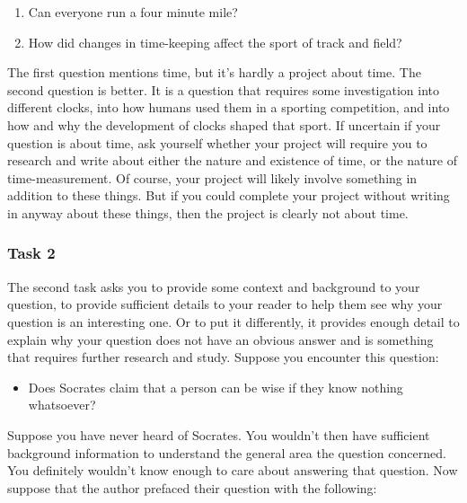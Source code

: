\documentclass[]{article}
\providecommand{\tightlist}{%
  \setlength{\itemsep}{0pt}\setlength{\parskip}{0pt}}
\begin{document}
\begin{enumerate}
\def\labelenumi{\arabic{enumi}.}
\tightlist
\item
  Can everyone run a four minute mile?
\item
  How did changes in time-keeping affect the sport of track and field?
\end{enumerate}

The first question mentions time, but it's hardly a project about time.
The second question is better. It is a question that requires some
investigation into different clocks, into how humans used them in a
sporting competition, and into how and why the development of clocks
shaped that sport. If uncertain if your question is about time, ask
yourself whether your project will require you to research and write
about either the nature and existence of time, or the nature of
time-measurement. Of course, your project will likely involve something
in addition to these things. But if you could complete your project
without writing in anyway about these things, then the project is
clearly not about time.

\hypertarget{task-2}{%
\subsubsection{Task 2}\label{task-2}}

The second task asks you to provide some context and background to your
question, to provide sufficient details to your reader to
help them see why your question is an interesting one. Or to put it
differently, it provides enough detail to explain why your question does
not have an obvious answer and is something that requires further
research and study. Suppose you encounter this question:

\begin{itemize}
\tightlist
\item
  Does Socrates claim that a person can be wise if they know nothing
  whatsoever?
\end{itemize}

Suppose you have never heard of Socrates. You wouldn't then have sufficient background information to understand the general area the question concerned. You definitely wouldn't know enough to care about answering
that question. Now suppose that the author prefaced their question with
the following:
\end{document}

